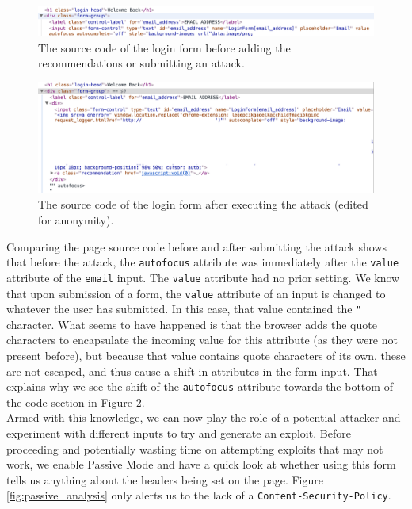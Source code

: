 \begin{figure}[h!]
	\centering
	\includegraphics[width=\linewidth]{images/test_case_1/src_code_before.png}
	\caption{The source code of the login form before adding the recommendations or submitting an attack.}
	\label{fig:src_code_before}
\end{figure}

\begin{figure}[h!]
	\centering
	\includegraphics[width=\linewidth]{images/test_case_1/src_code_after.png}
	\caption{The source code of the login form after executing the attack (edited for anonymity).}
	\label{fig:src_code_after}	
\end{figure} 

Comparing the page source code before and after submitting the attack shows that before the attack, the \texttt{autofocus} attribute was immediately after the \texttt{value} attribute of the \texttt{email} input. The \texttt{value} attribute had no prior setting. We know that upon submission of a form, the \texttt{value} attribute of an input is changed to whatever the user has submitted. In this case, that value contained the \texttt{"} character. What seems to have happened is that the browser adds the quote characters to encapsulate the incoming value for this attribute (as they were not present before), but because that value contains quote characters of its own, these are not escaped, and thus cause a shift in attributes in the form input. That explains why we see the shift of the \texttt{autofocus} attribute towards the bottom of the code section in Figure \ref{fig:src_code_after}. \\

Armed with this knowledge, we can now play the role of a potential attacker and experiment with different inputs to try and generate an exploit. Before proceeding and potentially wasting time on attempting exploits that may not work, we enable Passive Mode and have a quick look at whether using this form tells us anything about the headers being set on the page. Figure \ref{fig:passive_analysis} only alerts us to the lack of a \texttt{Content-Security-Policy}. \\

